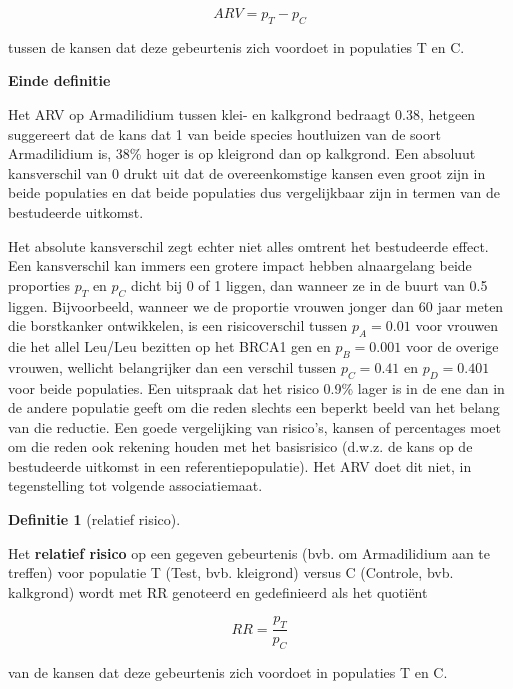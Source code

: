 \documentclass[
  12pt,dutch,coursenotes]{book}
\theoremstyle{definition}
\newtheorem{definition}{Definitie}[chapter]
\theoremstyle{definition}
\theoremstyle{definition}
\theoremstyle{definition}
\theoremstyle{remark}
\begin{document}
\begin{equation*}
ARV=p_T-p_C
\end{equation*}

tussen de kansen dat deze gebeurtenis zich voordoet in populaties T en C.

\textbf{Einde definitie}

Het ARV op Armadilidium tussen klei- en kalkgrond bedraagt 0.38, hetgeen suggereert dat de kans dat 1 van beide species houtluizen van de soort Armadilidium is, 38\% hoger is op kleigrond dan op kalkgrond. Een absoluut kansverschil
van 0 drukt uit dat de overeenkomstige kansen even groot zijn in beide
populaties en dat beide populaties dus vergelijkbaar zijn in termen van de bestudeerde uitkomst.

Het absolute kansverschil zegt echter niet alles omtrent het
bestudeerde effect. Een kansverschil kan immers een grotere impact hebben
alnaargelang beide proporties \(p_T\) en \(p_C\) dicht bij 0 of 1 liggen, dan
wanneer ze in de buurt van 0.5 liggen.
Bijvoorbeeld, wanneer we de proportie
vrouwen jonger dan 60 jaar meten die borstkanker ontwikkelen, is
een risicoverschil tussen \(p_A=0.01\) voor vrouwen die het allel Leu/Leu bezitten op het BRCA1 gen
en \(p_B=0.001\) voor de overige vrouwen, wellicht belangrijker dan een verschil tussen \(p_C=0.41\) en \(p_D=0.401\) voor beide populaties. Een uitspraak dat het risico 0.9\% lager is in de ene dan in de andere populatie geeft om die reden slechts een beperkt beeld van het belang van die reductie. Een goede vergelijking van risico's, kansen of percentages moet om die reden ook rekening houden met het basisrisico (d.w.z. de kans op de bestudeerde uitkomst in een referentiepopulatie). Het ARV doet dit niet, in tegenstelling tot volgende associatiemaat.

\begin{definition}[relatief risico]
\protect\hypertarget{def:unnamed-chunk-111}{}{\label{def:unnamed-chunk-111} {} }
\end{definition}
Het \textbf{relatief risico} op een gegeven gebeurtenis (bvb. om Armadilidium aan te treffen) voor populatie T (Test, bvb. kleigrond) versus C (Controle, bvb. kalkgrond) wordt met RR
genoteerd en gedefinieerd als het quotiënt

\begin{equation*}
RR=\frac{p_T}{p_C}
\end{equation*}

van de kansen dat deze gebeurtenis zich voordoet in populaties T en C.
\end{document}
